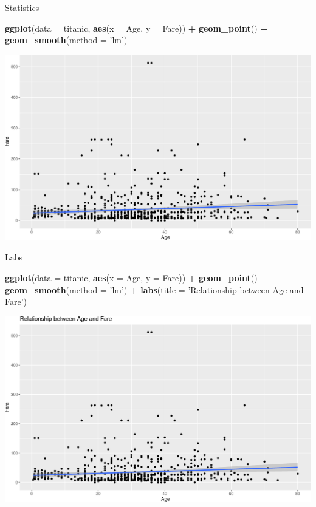 \documentclass[
]{book}
\newenvironment{Shaded}{\begin{snugshade}}{\end{snugshade}}
\newcommand{\DataTypeTok}[1]{\textcolor[rgb]{0.13,0.29,0.53}{#1}}
\newcommand{\KeywordTok}[1]{\textcolor[rgb]{0.13,0.29,0.53}{\textbf{#1}}}
\newcommand{\NormalTok}[1]{#1}
\newcommand{\OperatorTok}[1]{\textcolor[rgb]{0.81,0.36,0.00}{\textbf{#1}}}
\newcommand{\StringTok}[1]{\textcolor[rgb]{0.31,0.60,0.02}{#1}}
\begin{document}
Statistics

\begin{Shaded}
\begin{Highlighting}[]
\KeywordTok{ggplot}\NormalTok{(}\DataTypeTok{data =}\NormalTok{ titanic, }\KeywordTok{aes}\NormalTok{(}\DataTypeTok{x =}\NormalTok{ Age, }\DataTypeTok{y =}\NormalTok{ Fare)) }\OperatorTok{+}\StringTok{ }\KeywordTok{geom_point}\NormalTok{() }\OperatorTok{+}\StringTok{ }\KeywordTok{geom_smooth}\NormalTok{(}\DataTypeTok{method =} \StringTok{'lm'}\NormalTok{)}
\end{Highlighting}
\end{Shaded}

\includegraphics{figures/unnamed-chunk-137-1.pdf}

Labs

\begin{Shaded}
\begin{Highlighting}[]
\KeywordTok{ggplot}\NormalTok{(}\DataTypeTok{data =}\NormalTok{ titanic, }\KeywordTok{aes}\NormalTok{(}\DataTypeTok{x =}\NormalTok{ Age, }\DataTypeTok{y =}\NormalTok{ Fare)) }\OperatorTok{+}\StringTok{ }\KeywordTok{geom_point}\NormalTok{() }\OperatorTok{+}\StringTok{ }\KeywordTok{geom_smooth}\NormalTok{(}\DataTypeTok{method =} \StringTok{'lm'}\NormalTok{) }\OperatorTok{+}\StringTok{ }\KeywordTok{labs}\NormalTok{(}\DataTypeTok{title =} \StringTok{'Relationship between Age and Fare'}\NormalTok{)}
\end{Highlighting}
\end{Shaded}

\includegraphics{figures/unnamed-chunk-138-1.pdf}
\end{document}
